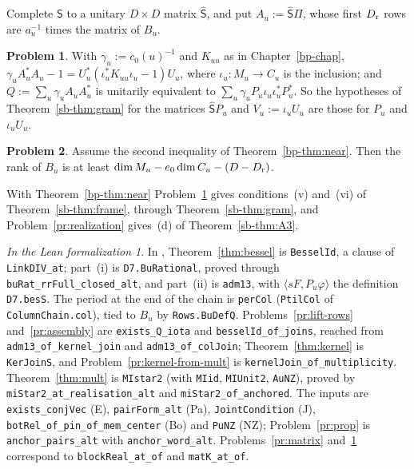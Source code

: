 \documentclass[reqno]{amsart}
\newcounter{chap}
\theoremstyle{definition}
\newtheorem{problem}{Problem}[section]
\theoremstyle{plain}
\theoremstyle{remark}
\newtheorem*{leanremark}{In the Lean formalization}
\newcommand{\tl}[1]{\texttt{#1}}
\begin{document}
Complete \(\mathsf S\) to a unitary \(D\times D\) matrix \(\hat{\mathsf S}\), and put \(A_u:=\hat{\mathsf S}\Pi\), whose first \(D_{\rm r}\) rows are \(a_u^{-1}\) times the matrix of \(B_u\).

\begin{problem}\label{pr:gram}
With \(\gamma_u:=c_0(u)^{-1}\) and \(K_{uu}\) as in Chapter~\ref{bp-chap}, \(\gamma_uA_u^*A_u-1=U_u^*(\iota_u^*K_{uu}\iota_u-1)U_u\), where \(\iota_u\colon M_u\to C_u\) is the inclusion; and \(Q:=\sum_u\gamma_uA_uA_u^*\) is unitarily equivalent to \(\sum_u\gamma_uP_u\iota_u\iota_u^*P_u^*\).  So the hypotheses of Theorem~\ref{sb-thm:gram} for the matrices \(\hat{\mathsf S}P_u\) and \(V_u:=\iota_uU_u\) are those for \(P_u\) and \(\iota_uU_u\).
\end{problem}

\begin{problem}\label{pr:rank}
Assume the second inequality of Theorem~\ref{bp-thm:near}.  Then the rank of \(B_u\) is at least \(\dim M_u-e_0\dim C_u-(D-D_{\rm r})\).
\end{problem}

With Theorem~\ref{bp-thm:near} Problem~\ref{pr:gram} gives conditions~(v) and~(vi) of Theorem~\ref{sb-thm:frame}, through Theorem~\ref{sb-thm:gram}, and Problem~\ref{pr:realization} gives~(d) of Theorem~\ref{sb-thm:A3}.

\begin{leanremark}
\raggedright In \cite{Lean}, Theorem~\ref{thm:bessel} is \tl{BesselId}, a clause of \tl{LinkDIV\_at}; part~(i) is \tl{D7.BuRational}, proved through \tl{buRat\_rrFull\_closed\_alt}, and part~(ii) is \tl{adm13}, with \(\langle sF,P_u\varphi\rangle\) the definition \tl{D7.besS}.  The period at the end of the chain is \tl{perCol} (\tl{PtilCol} of \tl{ColumnChain.col}), tied to \(B_u\) by \tl{Rows.BuDefQ}.  Problems~\ref{pr:lift-rows} and~\ref{pr:assembly} are \tl{exists\_Q\_iota} and \tl{besselId\_of\_joins}, reached from \tl{adm13\_of\_kernel\_join} and \tl{adm13\_of\_colJoin}; Theorem~\ref{thm:kernel} is \tl{KerJoinS}, and Problem~\ref{pr:kernel-from-mult} is \tl{kernelJoin\_of\_multiplicity}.  Theorem~\ref{thm:mult} is \tl{MIstar2} (with \tl{MIid}, \tl{MIUnit2}, \tl{AuNZ}), proved by \tl{miStar2\_at\_realisation\_alt} and \tl{miStar2\_of\_anchored}.  The inputs are \tl{exists\_conjVec} (E), \tl{pairForm\_alt} (Pa), \tl{JointCondition} (J), \tl{botRel\_of\_pin\_of\_mem\_center} (Bo) and \tl{PuNZ} (NZ); Problem~\ref{pr:prop} is \tl{anchor\_pairs\_alt} with \tl{anchor\_word\_alt}.  Problems~\ref{pr:matrix} and~\ref{pr:gram} correspond to \tl{blockReal\_at\_of} and \tl{matK\_at\_of}.
\end{leanremark}
\end{document}
